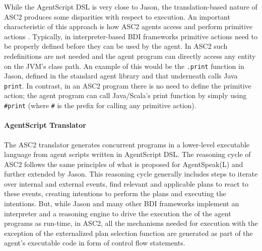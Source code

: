 While the AgentScript DSL is very close to Jason, the translation-based nature of ASC2 produces some disparities with respect to execution. An important characteristic of this approach is how ASC2 agents access and perform primitive actions \cite{MohajeriParizi2020}. Typically, in interpreter-based BDI frameworks primitive actions need to be properly defined before they can be used by the agent. In ASC2 such redefinitions are not needed and the agent program can directly access any entity on the JVM's class path. An example of this would be the \texttt{.print} function in Jason, defined in the standard agent library and that underneath calls Java \texttt{print}. In contrast, in an ASC2 program there is no need to define the primitive action; the agent program can call Java/Scala's print function by simply using \texttt{\#print} (where \texttt{\#} is the prefix for calling any primitive action).

\vspace{-5pt}
\paragraph{AgentScript Translator}
The ASC2 translator generates concurrent programs in a lower-level executable language from agent scripts written in AgentScript DSL. %
The reasoning cycle of ASC2 follows the same principles of what is proposed for AgentSpeak(L) and further extended by Jason. This reasoning cycle generally includes steps to iterate over internal and external events, find relevant and applicable plans to react to these events, creating intentions to perform the plans and executing the intentions. But,  while Jason and many other BDI frameworks implement an interpreter and a reasoning engine to drive the execution the of the agent programs as run-time, in ASC2, all the mechanisms needed for execution with the exception of the externalized plan selection function are generated as part of the agent's executable code in form of control flow statements.

\vspace{-5pt}
